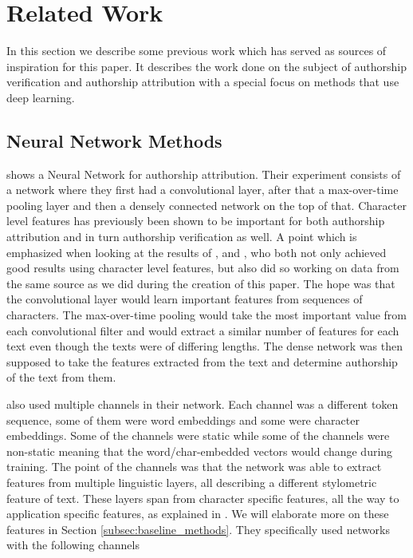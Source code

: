 \section{Related Work} \label{sec:related_work}

In this section we describe some previous work which has served as sources
of inspiration for this paper. It describes the work done on the subject of
authorship verification and authorship attribution with a special focus on
methods that use deep learning.


\subsection{Neural Network Methods}

\citet{DBLP:journals/corr/RuderGB16c} shows a Neural Network for authorship
attribution. Their experiment consists of a network where they first had
a convolutional layer, after that a max-over-time pooling layer and then a
densely connected network on the top of that. Character level features has
previously been shown to be important for both authorship attribution and in
turn authorship verification as well. A point which is emphasized when looking
at the results of \citet{hansen2014}, and \citet{aalykke2016}, who both not only
achieved good results using character level features, but also did so working on
data from the same source as we did during the creation of this paper. The hope
was that the convolutional layer would learn important features from sequences
of characters. The max-over-time pooling would take the most important value
from each convolutional filter and would extract a similar number of features
for each text even though the texts were of differing lengths. The dense network
was then supposed to take the features extracted from the text and determine
authorship of the text from them.

\citet{DBLP:journals/corr/RuderGB16c} also used multiple channels in their
network. Each channel was a different token sequence, some of them were word
embeddings and some were character embeddings. Some of the channels were static
while some of the channels were non-static meaning that the word/char-embedded
vectors would change during training. The point of the channels was that the
network was able to extract features from multiple linguistic layers, all
describing a different stylometric feature of text. These layers span from
character specific features, all the way to application specific features,
as explained in \citet[Section 2]{stamatos2009}. We will elaborate more on
these features in Section \ref{subsec:baseline_methods}. They specifically used
networks with the following channels

